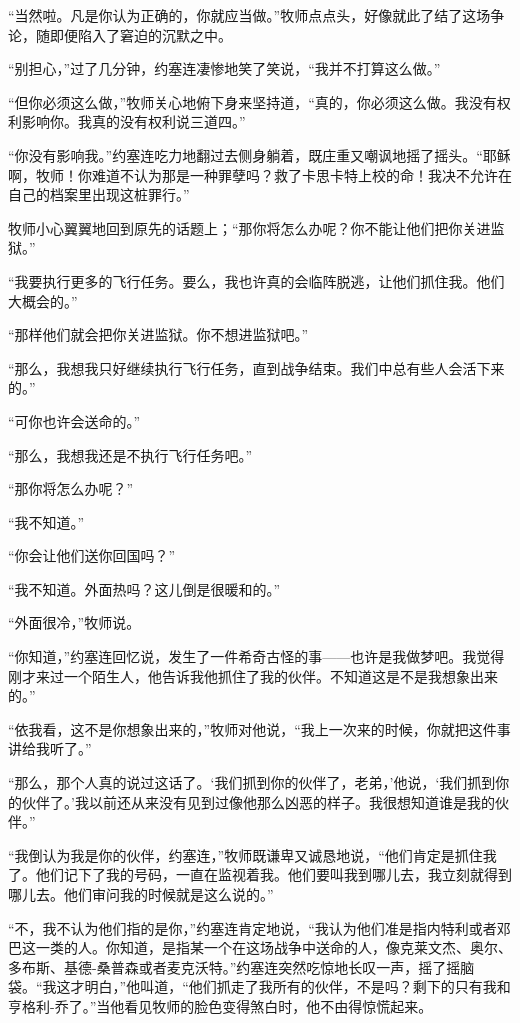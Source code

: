     “当然啦。凡是你认为正确的，你就应当做。”牧师点点头，好像就此了结了这场争论，随即便陷入了窘迫的沉默之中。

    “别担心，”过了几分钟，约塞连凄惨地笑了笑说，“我并不打算这么做。”

    “但你必须这么做，”牧师关心地俯下身来坚持道，“真的，你必须这么做。我没有权利影响你。我真的没有权利说三道四。”

    “你没有影响我。”约塞连吃力地翻过去侧身躺着，既庄重又嘲讽地摇了摇头。“耶稣啊，牧师！你难道不认为那是一种罪孽吗？救了卡思卡特上校的命！我决不允许在自己的档案里出现这桩罪行。”

    牧师小心翼翼地回到原先的话题上；“那你将怎么办呢？你不能让他们把你关进监狱。”

    “我要执行更多的飞行任务。要么，我也许真的会临阵脱逃，让他们抓住我。他们大概会的。”

    “那样他们就会把你关进监狱。你不想进监狱吧。”

    “那么，我想我只好继续执行飞行任务，直到战争结束。我们中总有些人会活下来的。”

    “可你也许会送命的。”

    “那么，我想我还是不执行飞行任务吧。”

    “那你将怎么办呢？”

    “我不知道。”

    “你会让他们送你回国吗？”

    “我不知道。外面热吗？这儿倒是很暖和的。”

    “外面很冷，”牧师说。

    “你知道，”约塞连回忆说，发生了一件希奇古怪的事——也许是我做梦吧。我觉得刚才来过一个陌生人，他告诉我他抓住了我的伙伴。不知道这是不是我想象出来的。”

    “依我看，这不是你想象出来的，”牧师对他说，“我上一次来的时候，你就把这件事讲给我听了。”

    “那么，那个人真的说过这话了。‘我们抓到你的伙伴了，老弟，’他说，‘我们抓到你的伙伴了。’我以前还从来没有见到过像他那么凶恶的样子。我很想知道谁是我的伙伴。”

    “我倒认为我是你的伙伴，约塞连，”牧师既谦卑又诚恳地说，“他们肯定是抓住我了。他们记下了我的号码，一直在监视着我。他们要叫我到哪儿去，我立刻就得到哪儿去。他们审问我的时候就是这么说的。”

    “不，我不认为他们指的是你，”约塞连肯定地说，“我认为他们准是指内特利或者邓巴这一类的人。你知道，是指某一个在这场战争中送命的人，像克莱文杰、奥尔、多布斯、基德-桑普森或者麦克沃特。”约塞连突然吃惊地长叹一声，摇了摇脑袋。“我这才明白，”他叫道，“他们抓走了我所有的伙伴，不是吗？剩下的只有我和亨格利-乔了。”当他看见牧师的脸色变得煞白时，他不由得惊慌起来。

